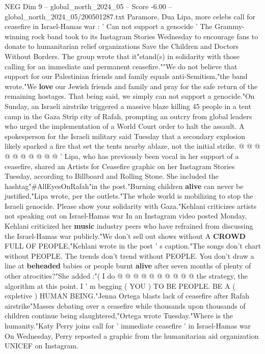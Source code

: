 \begin{textsample}{NEG Dim 9 – global\_north\_2024\_05 – Score -6.00 – global\_north\_2024\_05/200501287.txt}  \label{ex:f9_neg_237}
Paramore, Dua Lipa, more celebs call for ceasefire in Israel-Hamas war : ' Can not support a genocide ' The Grammy-winning rock band took to its Instagram Stories Wednesday to encourage fans to donate to humanitarian relief organizations Save the Children and Doctors Without Borders.
The group wrote that it"stand(s) in solidarity with those calling for an immediate and permanent ceasefire.""We do not believe that support for our Palestinian friends and family equals anti-Semitism,"the band wrote."We \textbf{love} our Jewish friends and family and pray for the safe return of the remaining hostages.
That being said, we simply can not support a genocide."On Sunday, an Israeli airstrike triggered a massive blaze killing 45 people in a tent camp in the Gaza Strip city of Rafah, prompting an outcry from global leaders who urged the implementation of a World Court order to halt the assault.
A spokesperson for the Israeli military said Tuesday that a secondary explosion likely sparked a fire that set the tents nearby ablaze, not the initial strike. @ @ @ @ @ @ @ @ @ @ ' Lipa, who has previously been vocal in her support of a ceasefire, shared an Artists for Ceasefire graphic on her Instagram Stories Tuesday, according to Billboard and Rolling Stone.
She included the hashtag"\#AllEyesOnRafah"in the post."Burning children \textbf{alive} can never be justified,"Lipa wrote, per the outlets."The whole world is mobilizing to stop the Israeli genocide.
Please show your solidarity with Gaza."Kehlani criticizes artists not speaking out on Israel-Hamas war In an Instagram video posted Monday, Kehlani criticized her \textbf{music} industry peers who have refrained from discussing the Israel-Hamas war publicly."We don't sell out shows without A \textbf{CROWD} FULL OF PEOPLE,"Kehlani wrote in the post ' s caption."The songs don't chart without PEOPLE.
The trends don't trend without PEOPLE.
You don't draw a line at \textbf{beheaded} babies or people burnt \textbf{alive} after seven months of plenty of other atrocities?"She added :"( I do @ @ @ @ @ @ @ @ @ @ the strategy, the algorithm at this point.
I ' m begging ( YOU ) TO BE PEOPLE.
BE A ( expletive ) HUMAN BEING."Jenna Ortega blasts lack of ceasefire after Rafah airstrike"Masses debating over a ceasefire while thousands upon thousands of children continue being slaughtered,"Ortega wrote Tuesday."Where is the humanity."Katy Perry joins call for ' immediate ceasefire ' in Israel-Hamas war On Wednesday, Perry reposted a graphic from the humanitarian aid organization UNICEF on Instagram.

\end{textsample}

